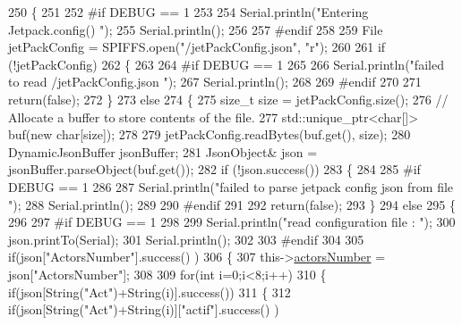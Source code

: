 \begin{DoxyCode}
250 \{
251 
252 \textcolor{preprocessor}{#if DEBUG == 1 }
253 
254     Serial.println(\textcolor{stringliteral}{"Entering Jetpack.config() "});
255     Serial.println();
256 
257 \textcolor{preprocessor}{#endif}
258 
259     File jetPackConfig = SPIFFS.open(\textcolor{stringliteral}{"/jetPackConfig.json"}, \textcolor{stringliteral}{"r"});
260 
261     \textcolor{keywordflow}{if} (!jetPackConfig) 
262     \{
263 
264 \textcolor{preprocessor}{    #if DEBUG == 1 }
265 
266         Serial.println(\textcolor{stringliteral}{"failed to read /jetPackConfig.json "});
267         Serial.println();
268 
269 \textcolor{preprocessor}{    #endif}
270 
271         \textcolor{keywordflow}{return}(\textcolor{keyword}{false});
272     \}
273     \textcolor{keywordflow}{else}
274     \{
275         \textcolor{keywordtype}{size\_t} size = jetPackConfig.size();
276         \textcolor{comment}{// Allocate a buffer to store contents of the file.}
277         std::unique\_ptr<char[]> buf(\textcolor{keyword}{new} \textcolor{keywordtype}{char}[size]);
278 
279         jetPackConfig.readBytes(buf.get(), size);
280         DynamicJsonBuffer jsonBuffer;
281         JsonObject& json = jsonBuffer.parseObject(buf.get());
282         \textcolor{keywordflow}{if} (!json.success()) 
283         \{
284         
285 \textcolor{preprocessor}{        #if DEBUG == 1 }
286 
287             Serial.println(\textcolor{stringliteral}{"failed to parse jetpack config json from file "});
288             Serial.println();
289 
290 \textcolor{preprocessor}{        #endif}
291 
292             \textcolor{keywordflow}{return}(\textcolor{keyword}{false});
293         \} 
294         \textcolor{keywordflow}{else}
295         \{ 
296         
297 \textcolor{preprocessor}{        #if DEBUG == 1 }
298 
299             Serial.println(\textcolor{stringliteral}{"read configuration file : "});
300             json.printTo(Serial);
301             Serial.println();
302         
303 \textcolor{preprocessor}{        #endif}
304   
305             \textcolor{keywordflow}{if}(json[\textcolor{stringliteral}{"ActorsNumber"}].success() )
306             \{
307                 this->\hyperlink{classJetpack_a52c86319cb3f7f1ab744a64db18a7ba5}{actorsNumber} = json[\textcolor{stringliteral}{"ActorsNumber"}]; 
308             
309                 \textcolor{keywordflow}{for}(\textcolor{keywordtype}{int} i=0;i<8;i++)
310                 \{   \textcolor{keywordflow}{if}(json[String(\textcolor{stringliteral}{"Act"})+String(i)].success())
311                     \{
312                         \textcolor{keywordflow}{if}(json[String(\textcolor{stringliteral}{"Act"})+String(i)][\textcolor{stringliteral}{"actif"}].success() )

\end{DoxyCode}

